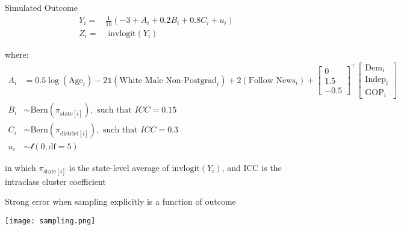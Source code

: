 \documentclass[ignorenonframetext, 10pt, aspectratio=169]{beamer}
\begin{document}
\begin{frame}
{Simulated Outcome}
\begin{align*}
Y_i =& \frac{1}{10}(-3 + A_i + 0.2 B_i + 0.8 C_i + u_i)\\
Z_i =& \text{ invlogit}(Y_i)
\end{align*}

where:
\begin{align*}
A_i &= 0.5\log(\text{Age}_i) -2\mathds{1}(\text{White Male Non-Postgrad}_i) + 2(\text{Follow News}_i) + \begin{bmatrix}0\\1.5\\-0.5\end{bmatrix}^\top\begin{bmatrix}\text{Dem}_{i}\\\text{Indep}_i\\\text{GOP}_i\end{bmatrix}\\
B_i &\sim \text{Bern}(\pi_{\text{state}[i]}), \text{ such that }  ICC = 0.15\\
C_i &\sim \text{Bern}(\pi_{\text{district}[i]}), \text{ such that }  ICC = 0.3\\
u_i &\sim \mathcal{t}(0, \text{df} = 5)
\end{align*}

\normalsize
in which \(\pi_{\text{state}[i]}\) is the state-level average of \(\text{invlogit}(Y_i)\), and ICC is the intraclass cluster coefficient


\end{frame}

\begin{frame}
{Strong error when sampling explicitly is a function of outcome}

\centering
\texttt{[image: sampling.png]}
\end{frame}
\end{document}
